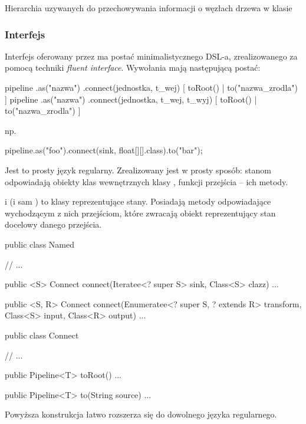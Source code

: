 {Hierarchia uzywanych do przechowywania informacji o węzłach drzewa w klasie }


\subsubsection{Interfejs}

Interfejs oferowany przez  ma postać minimalistycznego DSL-a, zrealizowanego za
pomocą techniki \textit{fluent interface}. Wywołania mają następującą postać:

\begin{java}
  pipeline {  .as("nazwa") } .connect(jednostka, t_wej) [ toRoot() | to("nazwa_zrodla") ]
  pipeline {  .as("nazwa") } .connect(jednostka, t_wej, t_wyj) [ toRoot() | to("nazwa_zrodla") ]
\end{java}

np. 

\begin{java}
  pipeline.as("foo").connect(sink, float[][].class).to("bar");
\end{java}

Jest to prosty język regularny. Zrealizowany jest w prosty sposób: stanom odpowiadają obiekty klas
wewnętrznych klasy , funkcji przejścia -- ich metody.


 i  (i sam ) to klasy reprezentujące stany. Posiadają
metody odpowiadające wychodzącym z nich przejściom, które zwracają obiekt reprezentujący stan
docelowy danego przejścia.

\begin{java}
public class Named {
    // ...

    public <S> Connect connect(Iteratee<? super S> sink, Class<S> clazz) { ... }

    public <S, R> Connect connect(Enumeratee<? super S, ? extends R> transform, 
        Class<S> input, Class<R> output) { ... }
}

public class Connect {
    // ...

    public Pipeline<T> toRoot() { ... }

    public Pipeline<T> to(String source) { ... }

}
\end{java}

\begin{Note}
  Powyższa konstrukcja łatwo rozszerza się do dowolnego języka regularnego. 
\end{Note}


